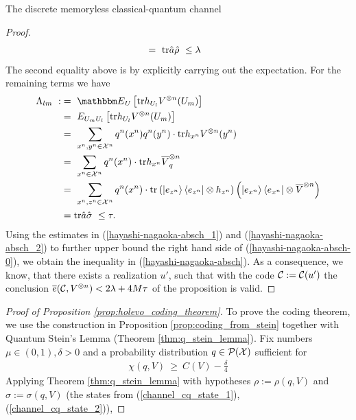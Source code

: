 \begin{section}{The discrete memoryless  classical-quantum channel}
\begin{proof}
\begin{align}
  		 &= \ \mathrm{tr} \hat{a}\hat{\rho} \ \leq \lambda \label{hayashi-nagaoka-absch_1}
  		\end{align}
		The second equality above is by explicitly carrying out the expectation. For the remaining terms we have
		\begin{align}
		 \Lambda_{lm} \ 
		 :&= \ \bbmE_{U}\left[\tr h_{U_l}V^{\otimes n}(U_m) \right] \nonumber \\
		 &= \ E_{U_mU_l}\left[\tr h_{U_l}V^{\otimes n}(U_m)\right] \nonumber \\
		 &= \ \sum_{x^n,y^n \in \cX^n} q^n(x^n)q^n(y^n) \cdot \tr h_{x^n}V^{\otimes n}(y^n) 
		 \nonumber \\
		 &= \ \sum_{x^n \in \cX^n} q^n(x^n) \cdot \tr h_{x^n}\overline{V}_q^{\otimes n} \nonumber \\
		 &= \ \sum_{x^n, z^n \in \cX^n} q^n(x^n) \cdot \tr\left(\ket{e_{z^n}}\bra{e_{z^n}} \otimes h_{z^n}\right)\left(\ket{e_{x^n}}\bra{e_{x^n}} \otimes \overline{V}^{\otimes n}  \right) \nonumber \\ 
		 &= \tr\hat{a}\hat{\sigma}  \ \leq \tau. \label{hayashi-nagaoka-absch_2}
		 \end{align}
		 Using the estimates in (\ref{hayashi-nagaoka-absch_1}) and (\ref{hayashi-nagaoka-absch_2}) to further upper bound the right hand side of (\ref{hayashi-nagaoka-absch-0}), we obtain the inequality in (\ref{hayashi-nagaoka-absch}). As a consequence, we know, that there exists a realization $u'$, such that with the code ${\mathcal C} := {\mathcal C}(u')$ the conclusion $\overline{e}({\mathcal C}, V^{\otimes n}) < 2 \lambda + 4M\tau$ of the proposition is valid. 
       \end{proof}		
       \begin{proof}[Proof of Proposition \ref{prop:holevo_coding_theorem}]
        To prove the coding theorem, we use the construction in Proposition \ref{prop:coding_from_stein} together with Quantum Stein's Lemma (Theorem \ref{thm:q_stein_lemma}). Fix numbers $\mu \in (0,1), \delta > 0$ and a probability distribution $q \in {\mathcal P}({\mathcal X})$ sufficient for 
        \begin{align}
        \chi(q,V) \ \geq \ C(V) - \frac{\delta}{4}  \label{near_holevo_information}
        \end{align}
   		 Applying Theorem \ref{thm:q_stein_lemma} with hypotheses $\rho := \rho(q,V)$ and $\sigma := \sigma(q,V)$ (the states from (\ref{channel_cq_state_1}), (\ref{channel_cq_state_2})), 
	   

\end{proof}
\end{section}
